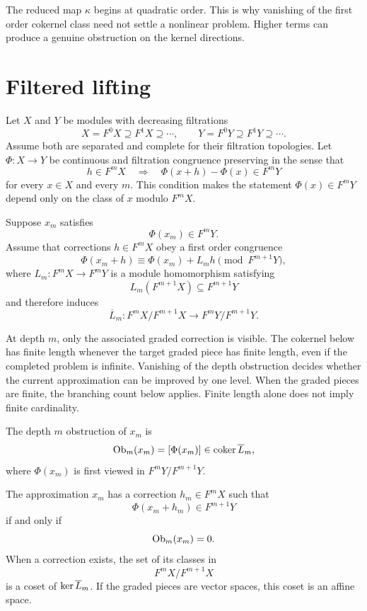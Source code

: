\begin{remark}\label{rem:higher_obstruction}
The reduced map $\kappa$ begins at quadratic order.  This is why vanishing of the first order cokernel class need not settle a nonlinear problem.  Higher terms can produce a genuine obstruction on the kernel directions.
\end{remark}

\section{Filtered lifting}\label{sec:filtered_lifting}

Let $X$ and $Y$ be modules with decreasing filtrations
\[
X=F^0X\supseteq F^1X\supseteq\cdots,
\qquad
Y=F^0Y\supseteq F^1Y\supseteq\cdots.
\]
Assume both are separated and complete for their filtration topologies.  Let $\Phi:X\to Y$ be continuous and filtration congruence preserving in the sense that
\[
h\in F^mX
\quad\Longrightarrow\quad
\Phi(x+h)-\Phi(x)\in F^mY
\]
for every $x\in X$ and every $m$.  This condition makes the statement $\Phi(x)\in F^mY$ depend only on the class of $x$ modulo $F^mX$.

Suppose $x_m$ satisfies
\[
\Phi(x_m)\in F^mY.
\]
Assume that corrections $h\in F^mX$ obey a first order congruence
\[
\Phi(x_m+h)
\equiv
\Phi(x_m)+L_mh
\pmod{F^{m+1}Y},
\]
where $L_m:F^mX\to F^mY$ is a module homomorphism satisfying
\[
L_m(F^{m+1}X)\subseteq F^{m+1}Y
\]
and therefore induces
\[
\overline L_m:
F^mX/F^{m+1}X
\longrightarrow
F^mY/F^{m+1}Y.
\]


At depth $m$, only the associated graded correction is visible. The cokernel below has finite length whenever the target graded piece has finite length, even if the completed problem is infinite. Vanishing of the depth obstruction decides whether the current approximation can be improved by one level. When the graded pieces are finite, the branching count below applies. Finite length alone does not imply finite cardinality.

\begin{definition}\label{def:depth_obstruction}
The depth $m$ obstruction of $x_m$ is
\[
\operatorname{Ob}_m(x_m)
=
[\Phi(x_m)]
\in
\operatorname{coker}\overline L_m,
\]
where $\Phi(x_m)$ is first viewed in $F^mY/F^{m+1}Y$.
\end{definition}

\begin{theorem}\label{thm:one_step_lifting}
The approximation $x_m$ has a correction $h_m\in F^mX$ such that
\[
\Phi(x_m+h_m)\in F^{m+1}Y
\]
if and only if
\[
\operatorname{Ob}_m(x_m)=0.
\]
When a correction exists, the set of its classes in
\[
F^mX/F^{m+1}X
\]
is a coset of $\operatorname{ker}\overline L_m$.  If the graded pieces are vector spaces, this coset is an affine space.
\end{theorem}

